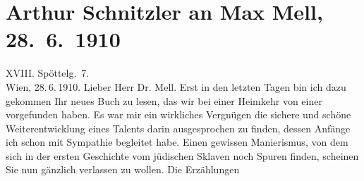 

         
         \renewcommand{\erwaehntePersonen}{Personen: Max Mell, Maria Mell, Olga Schnitzler}
         \renewcommand{\erwaehnteOrte}{Orte: Edmund-Weiß-Gasse, Schweiz, Wien}
         \renewcommand{\erwaehnteWerke}{Werke: Geschichte eines jüdischen Sklaven, Jägerhaussage und andere Novellen}
               \section[Arthur Schnitzler an Max Mell, 28. 6. 1910]{ Arthur Schnitzler an Max Mell, 28. 6. 1910}\nopagebreak{}\rehead{ }\begin{ledgroupsized}[t]{13cm}\normalsize\beginnumbering \toendnotes[C]{\smallbreak\pagebreak[2]} 
\toendnotes[C]{\smallbreak}\pstart
           \raggedleft{}{\pb}XVIII. Spöttelg. 7.{\\}Wien, 28. 6. 1910.\pend
           \pstart\center{}Lieber Herr Dr. Mell.\pend\pstart
           Erst in den letzten Tagen bin ich dazu gekommen Ihr neues Buch zu lesen, das wir bei einer Heimkehr
               von einer \label{K_L01940-1v}\label{K_L01940-1h}
               vorgefunden haben. Es war mir ein wirkliches Vergnügen die sichere und schöne
               Weiterentwicklung eines Talents darin ausgesprochen zu finden, dessen Anfänge ich
               schon mit Sympathie begleitet habe. Einen gewissen Manierismus, von dem sich in der
               ersten Geschichte vom jüdischen Sklaven noch
               Spuren finden, scheinen Sie nun gänzlich verlassen zu wollen. Die Erzählungen

\end{ledgroupsized}
